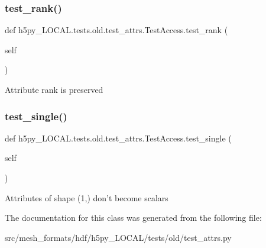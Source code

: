 \subsubsection{\texorpdfstring{test\+\_\+rank()}{test\_rank()}}
{\footnotesize\ttfamily def h5py\+\_\+\+L\+O\+C\+A\+L.\+tests.\+old.\+test\+\_\+attrs.\+Test\+Access.\+test\+\_\+rank (\begin{DoxyParamCaption}\item[{}]{self }\end{DoxyParamCaption})}

\begin{DoxyVerb}Attribute rank is preserved \end{DoxyVerb}
 \mbox{\label{classh5py__LOCAL_1_1tests_1_1old_1_1test__attrs_1_1TestAccess_a6bf3df5f3ee4cf13edd758a300caad5b}} 
\subsubsection{\texorpdfstring{test\+\_\+single()}{test\_single()}}
{\footnotesize\ttfamily def h5py\+\_\+\+L\+O\+C\+A\+L.\+tests.\+old.\+test\+\_\+attrs.\+Test\+Access.\+test\+\_\+single (\begin{DoxyParamCaption}\item[{}]{self }\end{DoxyParamCaption})}

\begin{DoxyVerb}Attributes of shape (1,) don't become scalars \end{DoxyVerb}
 

The documentation for this class was generated from the following file\+:\begin{DoxyCompactItemize}
\item 
src/mesh\+\_\+formats/hdf/h5py\+\_\+\+L\+O\+C\+A\+L/tests/old/test\+\_\+attrs.\+py\end{DoxyCompactItemize}

